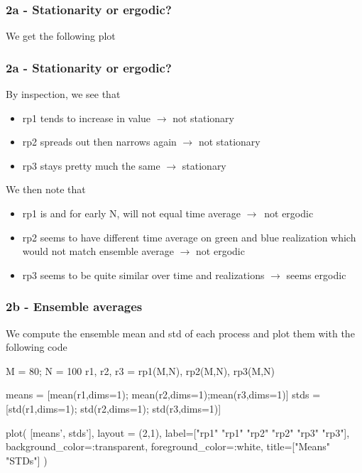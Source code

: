 \documentclass[compress]{beamer}
\begin{document}
\begin{frame}
    \frametitle{2a - Stationarity or ergodic?}
    We get the following plot
    \begin{figure}
        
    \end{figure}
\end{frame}

\begin{frame}
    \frametitle{2a - Stationarity or ergodic?}
    By inspection, we see that
    \begin{itemize}
        \item rp1 tends to increase in value $\rightarrow$ not stationary
        \item rp2 spreads out then narrows again $\rightarrow$
            not stationary
        \item rp3 stays pretty much the same $\rightarrow$ stationary
    \end{itemize}
    We then note that
    \begin{itemize}
        \item rp1 is and for early N, will not equal time average
            $\rightarrow$ not ergodic
        \item rp2 seems to have different time average on green and blue
            realization which would not match ensemble average $\rightarrow$
            not ergodic
        \item rp3 seems to be quite similar over time and realizations
            $\rightarrow$ seems ergodic
    \end{itemize}
\end{frame}

\begin{frame}[fragile]
    \frametitle{2b - Ensemble averages}
    We compute the ensemble mean and std of each process
    and plot them with the following code
    \begin{jllisting}[gobble=8]
        M = 80; N = 100
        r1, r2, r3 = rp1(M,N), rp2(M,N), rp3(M,N)

        means = [mean(r1,dims=1); mean(r2,dims=1);mean(r3,dims=1)]
        stds =  [std(r1,dims=1);  std(r2,dims=1); std(r3,dims=1)]

        plot(
            [means', stds'], layout = (2,1),
            label=["rp1" "rp1" "rp2" "rp2" "rp3" "rp3"],
            background_color=:transparent,
            foreground_color=:white,
            title=["Means" "STDs"]
        )
    \end{jllisting}
\end{frame}
\end{document}
